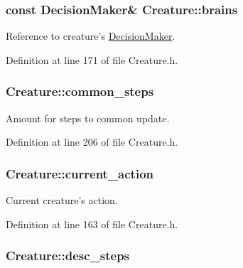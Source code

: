 \hypertarget{classCreature_a8499febfbaad5783181a01000cbc4dc6}{
\subsubsection[{brains}]{\setlength{\rightskip}{0pt plus 5cm}const {\bf Decision\-Maker}\& Creature\-::brains\hspace{0.3cm}{\ttfamily [protected]}}}\label{classCreature_a8499febfbaad5783181a01000cbc4dc6}


Reference to creature's \hyperlink{classDecisionMaker}{Decision\-Maker}. 



Definition at line 171 of file Creature.\-h.

\hypertarget{classCreature_aa1c351d6da7f1df976efb27fe21d5014}{
\subsubsection[{common\-\_\-steps}]{ Creature\-::common\-\_\-steps\hspace{0.3cm}{\ttfamily [protected]}}}\label{classCreature_aa1c351d6da7f1df976efb27fe21d5014}


Amount for steps to common update. 



Definition at line 206 of file Creature.\-h.

\hypertarget{classCreature_a3f97c007c64aa78502e9fa9cab716408}{
\subsubsection[{current\-\_\-action}]{ Creature\-::current\-\_\-action\hspace{0.3cm}{\ttfamily [protected]}}}\label{classCreature_a3f97c007c64aa78502e9fa9cab716408}


Current creature's action. 



Definition at line 163 of file Creature.\-h.

\hypertarget{classCreature_ad80371401e4349fd4c5b05367964b530}{
\subsubsection[{desc\-\_\-steps}]{ Creature\-::desc\-\_\-steps\hspace{0.3cm}{\ttfamily [protected]}}}\label{classCreature_ad80371401e4349fd4c5b05367964b530}


